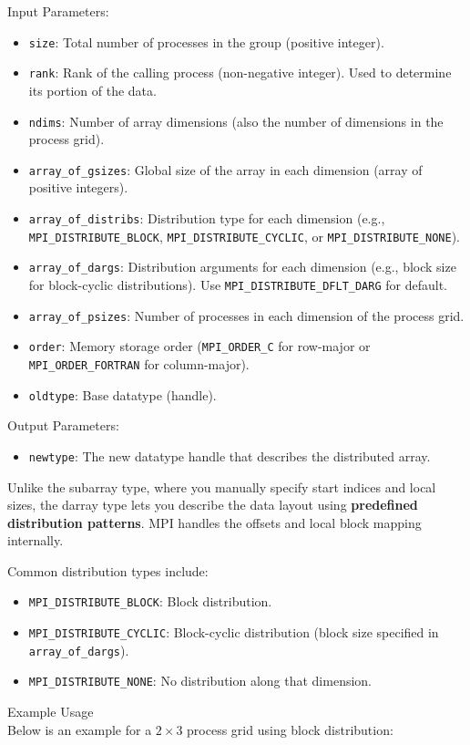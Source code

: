 \documentclass[12pt]{book}
\begin{document}
Input Parameters:
\begin{itemize}
    \item \texttt{size}: Total number of processes in the group (positive integer).
    \item \texttt{rank}: Rank of the calling process (non-negative integer). Used to determine its portion of the data.
    \item \texttt{ndims}: Number of array dimensions (also the number of dimensions in the process grid).
    \item \texttt{array\_of\_gsizes}: Global size of the array in each dimension (array of positive integers).
    \item \texttt{array\_of\_distribs}: Distribution type for each dimension (e.g., \texttt{MPI\_DISTRIBUTE\_BLOCK}, \texttt{MPI\_DISTRIBUTE\_CYCLIC}, or \texttt{MPI\_DISTRIBUTE\_NONE}).
    \item \texttt{array\_of\_dargs}: Distribution arguments for each dimension (e.g., block size for block-cyclic distributions). Use \texttt{MPI\_DISTRIBUTE\_DFLT\_DARG} for default.
    \item \texttt{array\_of\_psizes}: Number of processes in each dimension of the process grid.
    \item \texttt{order}: Memory storage order (\texttt{MPI\_ORDER\_C} for row-major or \texttt{MPI\_ORDER\_FORTRAN} for column-major).
    \item \texttt{oldtype}: Base datatype (handle).
\end{itemize}
Output Parameters:
\begin{itemize}
    \item \texttt{newtype}: The new datatype handle that describes the distributed array.
\end{itemize}

Unlike the subarray type, where you manually specify start indices and local sizes, the darray type lets you describe the data layout using \textbf{predefined distribution patterns}. MPI handles the offsets and local block mapping internally.

Common distribution types include:
\begin{itemize}
    \item \texttt{MPI\_DISTRIBUTE\_BLOCK}: Block distribution.
    \item \texttt{MPI\_DISTRIBUTE\_CYCLIC}: Block-cyclic distribution (block size specified in \texttt{array\_of\_dargs}).
    \item \texttt{MPI\_DISTRIBUTE\_NONE}: No distribution along that dimension.
\end{itemize}
Example Usage\\
Below is an example for a $2 \times 3$ process grid using block distribution:
\end{document}
